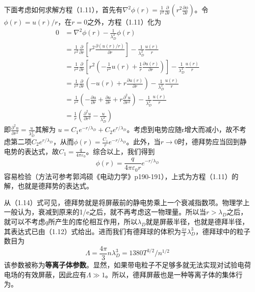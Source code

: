 			下面考虑如何求解方程（1.11），首先有$\nabla^2\phi(r)=\frac{1}{r^2}\frac{\partial}{\partial r}\left(r^2\frac{\partial\phi}{\partial r}\right)$。令$\phi(r)=u(r)/r$，在$r=0$之外，方程（1.11）化为
			\begin{equation}\label{key}
			\begin{aligned}
			0&=\nabla^2\phi(r)-\frac{1}{\lambda_D^2}\phi(r)\\
			&=\frac{1}{r^2}\frac{\partial}{\partial r}\left[r^2\frac{\partial(u(r)/r)}{\partial r}\right]-\frac{1}{\lambda_D^2}\frac{u(r)}{r}\\
			&=\frac{1}{r^2}\frac{\partial}{\partial r}\left[r^2\left(-\frac{1}{r^2}u(r)+\frac{1}{r}\frac{\partial u(r)}{\partial r}\right)\right]-\frac{1}{\lambda_D^2}\frac{u(r)}{r}\\
			&=\frac{1}{r^2}\frac{\partial}{\partial r}\left(-u(r)+r\frac{\partial u(r)}{\partial r}\right)-\frac{1}{\lambda_D^2}\frac{u(r)}{r}\\
			&=\frac{1}{r^2}\left(-\frac{\partial u}{\partial r}+\frac{\partial u}{\partial r}+r\frac{\partial^2 u}{\partial r^2}\right)-\frac{1}{\lambda_D^2}\frac{u(r)}{r}\\
			&=\frac{1}{r}\left(\frac{\partial^2 u}{\partial r^2}-\frac{u}{\lambda_D^2}\right)			
			\end{aligned}
			\end{equation}
			即$\frac{\partial^2 u}{\partial r^2}=\frac{u}{\lambda_D^2}$其解为
			$u=C_1 e^{-r/\lambda_D}+C_2 e^{r/\lambda_D}$。考虑到电势应随r增大而减小，故不考虑第二项$C_2 e^{r/\lambda_D}$，从而$\phi(r)=\frac{C_1}{r}e^{-r/\lambda_D}$。此外，当$r\to 0$时，德拜势应当回到静电势的表达式，故$C_1=\frac{q}{4\pi \varepsilon_0}$。综合以上，我们得到
			\begin{equation}\label{key}
			\boxed{\phi(r)=\frac{q}{4\pi \varepsilon_0 r}e^{-r/\lambda_D}}
			\end{equation}
			容易检验（方法可参考郭鸿硕《电动力学》p190-191），上式为方程（1.11）的解，也就是德拜势的表达式。
			
			从（1.14）式可见，德拜势就是将屏蔽前的静电势乘上一个衰减指数项。物理学上一般认为，衰减到原来的1/e之后，就不再考虑这一物理量。所以当$r>\lambda_D$之后，就可以不考虑$q$所产生的库伦相互作用，所以$\lambda_D$就是屏蔽半径，也就是德拜半径，其表达式已由（1.12）式给出。进而我们有德拜球的体积为$\frac{4\pi}{3}\lambda_D^3$，德拜球中的粒子数目为
			\begin{equation}\label{key}
			\boxed{\varLambda=\frac{4\pi}{3}n\lambda_D^3=1380T^{3/2}/n^{1/2}}
			\end{equation}
			该参数被称为\textbf{等离子体参数}。显然，如果带电粒子不足够多就无法实现对试验电荷电场的有效屏蔽，因此应有$\varLambda\gg 1$。所以，德拜屏蔽也是一种等离子体的集体行为。
			
